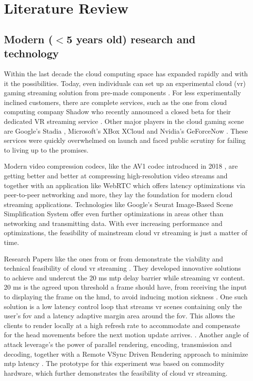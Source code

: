 \section{Literature Review}
\label{sec:lit}
\subsection{Modern ($<$5 years old) research and technology}

Within the last decade the cloud computing space has expanded rapidly and with it the possibilities. Today, even individuals can set up an experimental cloud (\acrfull{vr}) gaming streaming solution from pre-made components \parencite{tayoexe} \parencite{clouddesktopguide}. For less experimentally inclined customers, there are complete services, such as the one from cloud computing company Shadow \parencite{shadow} who recently announced a closed beta for their dedicated VR streaming service \parencite{shadowvr}. Other major players in the cloud gaming  scene are Google's Stadia \parencite{stadia}, Microsoft's XBox XCloud \parencite{xcloud} and Nvidia's GeForceNow \parencite{geforcenow}. These services were quickly overwhelmed on launch and faced public scrutiny for failing to living up to the promises. 

Modern video compression codecs, like the AV1 codec introduced in 2018 \parencite{av1}, are getting better and better at compressing high-resolution video streams and together with an application like WebRTC \parencite{webRTC} which offers latency optimizations via peer-to-peer networking and more, they lay the foundation for modern cloud streaming applications. Technologies like Google's Seurat Image\hyp{}Based Scene Simplification System \parencite{seurat} offer even further optimizations in areas other than networking and transmitting data. With ever increasing performance and optimizations, the feasibility of mainstream cloud \acrshort{vr} streaming is just a matter of time.

Research Papers like the ones from \cite{cutcord} or from \cite{mvr} demonstrate the viability and technical feasibility of cloud \acrshort{vr} streaming . They developed innovative solutions to achieve and undercut the 20 \acrfull{ms}  \acrfull{mtp} delay barrier while streaming \acrshort{vr} content. 20 \acrshort{ms} is the agreed upon threshold a frame should have, from receiving the input to displaying the frame on the \acrfull{hmd}, to avoid inducing motion sickness \parencite{valvevrlatency}. One such solution is a low latency control loop that streams \acrshort{vr} scenes containing only the user’s \acrfull{fov} and a latency adaptive margin area around the \acrshort{fov}. This allows the clients to render locally at a high refresh rate to accommodate and compensate for the head movements before the next motion update arrives. \parencite{mvr}. Another angle of attack  leverage's the power of parallel rendering, encoding, transmission and decoding, together with a Remote VSync Driven Rendering approach to minimize \acrshort{mtp} latency \parencite{cutcord}. The prototype for this experiment was based on commodity hardware, which further demonstrates the feasibility of cloud \acrshort{vr} streaming.

